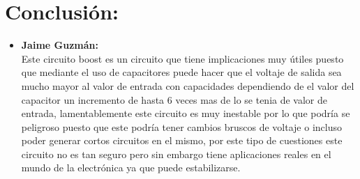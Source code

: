 \documentclass[12pt,letterpaper]{article}
\begin{document}
\section{Conclusión:}
\begin{itemize}
\item \textbf{Jaime Guzmán:}\\
Este circuito boost es un circuito que tiene implicaciones muy útiles puesto que mediante el uso de capacitores puede hacer que el voltaje de salida sea mucho mayor al valor de entrada con capacidades dependiendo de el valor del capacitor un incremento de hasta 6 veces mas de lo se tenia de valor de entrada, lamentablemente este circuito es muy inestable por lo que podría se peligroso puesto que este podría tener cambios bruscos de voltaje o incluso poder generar cortos circuitos en el mismo, por este tipo de cuestiones este circuito no es tan seguro pero sin embargo tiene aplicaciones reales en el mundo de la electrónica ya que puede estabilizarse.\\


\end{itemize}
\end{document}
